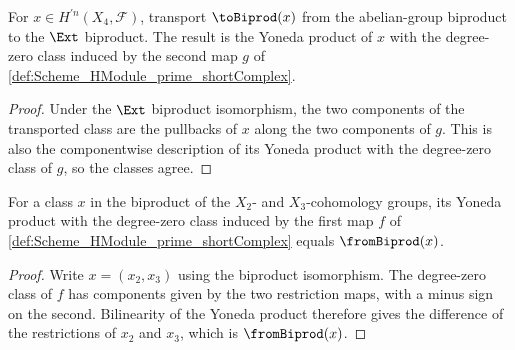 \begin{lemma}\leanok
  \label{lem:Scheme_HModule_prime_biprodAddEquiv_symm_biprodIsoProd_hom_toBiprod_apply}

  For \(x\in H^{\prime n}(X_4,\mathcal F)\), transport \(\toBiprod(x)\) from the abelian-group biproduct to the \(\Ext\) biproduct. The result is the Yoneda product of \(x\) with the degree-zero class induced by the second map \(g\) of \cref{def:Scheme_HModule_prime_shortComplex}.
\end{lemma}

\begin{proof}

  \leanok
  Under the \(\Ext\) biproduct isomorphism, the two components of the transported class are the pullbacks of \(x\) along the two components of \(g\). This is also the componentwise description of its Yoneda product with the degree-zero class of \(g\), so the classes agree.
\end{proof}

\begin{lemma}\leanok
  \label{lem:Scheme_HModule_prime_mk_zero_f_comp_biprodAddEquiv_symm_biprodIsoProd_hom}

  For a class \(x\) in the biproduct of the \(X_2\)- and \(X_3\)-cohomology groups, its Yoneda product with the degree-zero class induced by the first map \(f\) of \cref{def:Scheme_HModule_prime_shortComplex} equals \(\fromBiprod(x)\).
\end{lemma}

\begin{proof}

  \leanok
  Write \(x=(x_2,x_3)\) using the biproduct isomorphism. The degree-zero class of \(f\) has components given by the two restriction maps, with a minus sign on the second. Bilinearity of the Yoneda product therefore gives the difference of the restrictions of \(x_2\) and \(x_3\), which is \(\fromBiprod(x)\).
\end{proof}

